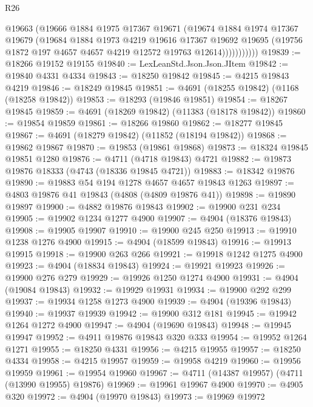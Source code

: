 \begin{lexlean}{R26}
\begin{coremodule}
                  @19663
                  (@19666
                    @1884
                    @1975
                    @17367
                    @19671
                    (@19674
                      @1884
                      @1974
                      @17367
                      @19679
                      (@19684
                        @1884
                        @1973
                        @4219
                        @19616
                        @17367
                        @19692
                        @19695
                        (@19756 @1872 @197 @4657 @4657 @4219 @12572 @19763 @12614)))))))))))
@19839 := @18266 @19152 @19155
@19840 := LexLeanStd.Json.Json.JItem
@19842 := @19840 @4331 @4334
@19843 := @18250 @19842
@19845 := @4215 @19843 @4219
@19846 := @18249 @19845
@19851 := @4691 (@18255 @19842) (@1168 (@18258 @19842))
@19853 := @18293 (@19846 @19851)
@19854 := @18267 @19845
@19859 := @4691 (@18269 @19842) (@11383 (@18178 @19842))
@19860 := @19854 @19859
@19861 := @18266 @19860
@19862 := @18277 @19845
@19867 := @4691 (@18279 @19842) (@11852 (@18194 @19842))
@19868 := @19862 @19867
@19870 := @19853 (@19861 @19868)
@19873 := @18324 @19845 @19851 @1280
@19876 := @4711 (@4718 @19843) @4721
@19882 := @19873 @19876 @18333 (@4743 (@18336 @19845 @4721))
@19883 := @18342 @19876
@19890 := @19883 @54 @194 @1278 @4657 @4657 @19843 @1263
@19897 := @4803 @19876 @41 @19843 (@4808 (@4809 @19876 @41))
@19898 := @19890 @19897
@19900 := @4882 @19876 @19843
@19902 := @19900 @231 @234
@19905 := @19902 @1234 @1277 @4900
@19907 := @4904 (@18376 @19843)
@19908 := @19905 @19907
@19910 := @19900 @245 @250
@19913 := @19910 @1238 @1276 @4900
@19915 := @4904 (@18599 @19843)
@19916 := @19913 @19915
@19918 := @19900 @263 @266
@19921 := @19918 @1242 @1275 @4900
@19923 := @4904 (@18834 @19843)
@19924 := @19921 @19923
@19926 := @19900 @276 @279
@19929 := @19926 @1250 @1274 @4900
@19931 := @4904 (@19084 @19843)
@19932 := @19929 @19931
@19934 := @19900 @292 @299
@19937 := @19934 @1258 @1273 @4900
@19939 := @4904 (@19396 @19843)
@19940 := @19937 @19939
@19942 := @19900 @312 @181
@19945 := @19942 @1264 @1272 @4900
@19947 := @4904 (@19690 @19843)
@19948 := @19945 @19947
@19952 := @4911 @19876 @19843 @320 @333
@19954 := @19952 @1264 @1271
@19955 := @18250 @4331
@19956 := @4215 @19955
@19957 := @18250 @4334
@19958 := @4215 @19957
@19959 := @19958 @4219
@19960 := @19956 @19959
@19961 := @19954 @19960
@19967 := @4711 (@14387 @19957) (@4711 (@13990 @19955) @19876)
@19969 := @19961 @19967 @4900
@19970 := @4905 @320
@19972 := @4904 (@19970 @19843)
@19973 := @19969 @19972

\end{coremodule}
\end{lexlean}
